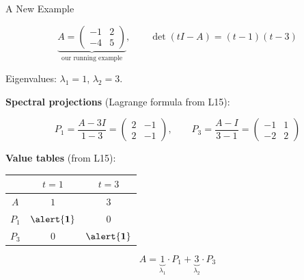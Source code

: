 \documentclass[10pt]{beamer}
\theoremstyle{definition}
\newcommand{\x}[1]{\alert{\textbf{#1}}}
\begin{document}
%
%
\begin{frame}[shrink=5]{A New Example}

$$\underbrace{A = \begin{pmatrix}-1&2\\-4&5\end{pmatrix}}_{\text{our running example}}, \qquad \det(tI - A) = (t-1)(t-3)$$

\vfill

Eigenvalues: $\lambda_1 = 1$, $\lambda_2 = 3$.

\vfill\pause

\x{Spectral projections} (Lagrange formula from L15):

$$P_1 = \frac{A - 3I}{1 - 3} = \begin{pmatrix}2&-1\\2&-1\end{pmatrix}, \qquad
P_3 = \frac{A - I}{3 - 1} = \begin{pmatrix}-1&1\\-2&2\end{pmatrix}$$

\vfill

\x{Value tables} (from L15):

\begin{center}
\renewcommand{\arraystretch}{1.3}
\begin{tabular}{c|cc}
 & $t = 1$ & $t = 3$ \\
\hline
$A$ & $1$ & $3$ \\
$P_1$ & $\x{1}$ & $0$ \\
$P_3$ & $0$ & $\x{1}$
\end{tabular}
\end{center}

\vfill

$$A = \underbrace{1}_{\lambda_1} \cdot P_1 + \underbrace{3}_{\lambda_2} \cdot P_3$$

\end{frame}
\end{document}
